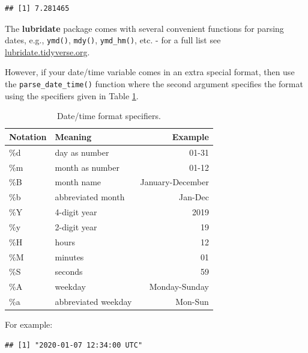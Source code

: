 \documentclass[
  12pt,
  krantz2]{krantz}
\makeatletter
\newenvironment{Shaded}{\begin{snugshade}}{\end{snugshade}}
\newcommand{\KeywordTok}[1]{\textcolor[rgb]{0.13,0.29,0.53}{\textbf{#1}}}
\newcommand{\NormalTok}[1]{#1}
\newcommand{\StringTok}[1]{\textcolor[rgb]{0.31,0.60,0.02}{#1}}
\newenvironment{kframe}{%
\medskip{}
\setlength{\fboxsep}{.8em}
 \def\at@end@of@kframe{}%
 \ifinner\ifhmode%
  \def\at@end@of@kframe{\end{minipage}}%
  \begin{minipage}{\columnwidth}%
 \fi\fi%
 \def\FrameCommand##1{\hskip\@totalleftmargin \hskip-\fboxsep
 \colorbox{shadecolor}{##1}\hskip-\fboxsep
     \hskip-\linewidth \hskip-\@totalleftmargin \hskip\columnwidth}%
 \MakeFramed {\advance\hsize-\width
   \@totalleftmargin\z@ \linewidth\hsize
   \@setminipage}}%
 {\par\unskip\endMakeFramed%
 \at@end@of@kframe}
\renewenvironment{Shaded}{\begin{kframe}}{\end{kframe}}
\makeatother
\begin{document}
\begin{verbatim}
## [1] 7.281465
\end{verbatim}

The \textbf{lubridate} package comes with several convenient functions for parsing dates, e.g., \texttt{ymd()}, \texttt{mdy()}, \texttt{ymd\_hm()}, etc. - for a full list see \url{lubridate.tidyverse.org}.

However, if your date/time variable comes in an extra special format, then use the \texttt{parse\_date\_time()} function where the second argument specifies the format using the specifiers given in Table \ref{tab:chap2-tab-timehelpers}.

\begin{table}[!h]

\caption{\label{tab:chap2-tab-timehelpers}Date/time format specifiers.}
\centering
\fontsize{9}{11}\selectfont
\begin{tabular}[t]{llr}
\toprule
Notation & Meaning & Example\\
\midrule
\%d & day as number & 01-31\\
\%m & month as number & 01-12\\
\%B & month name & January-December\\
\%b & abbreviated month & Jan-Dec\\
\%Y & 4-digit year & 2019\\
\%y & 2-digit year & 19\\
\%H & hours & 12\\
\%M & minutes & 01\\
\%S & seconds & 59\\
\%A & weekday & Monday-Sunday\\
\%a & abbreviated weekday & Mon-Sun\\
\bottomrule
\end{tabular}
\end{table}

For example:

\begin{Shaded}
\end{Shaded}

\begin{verbatim}
## [1] "2020-01-07 12:34:00 UTC"
\end{verbatim}
\end{document}
